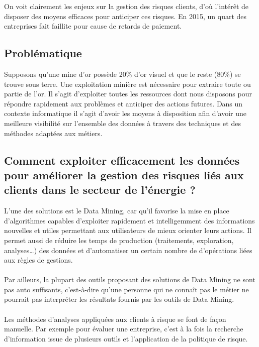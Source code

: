 \documentclass[11pt,a4paper]{report}
\begin{document}
On voit clairement les enjeux sur la gestion des risques clients, d'où l'intérêt de disposer des moyens efficaces pour anticiper ces risques. En 2015, un quart des entreprises fait faillite  pour cause de retards de paiement.

\newpage
\subsection{Problématique}
Supposons qu’une mine d’or possède 20\% d’or visuel et que le reste (80\%) se trouve sous terre. Une exploitation minière est nécessaire pour extraire toute ou partie de l’or. Il s'agit d'exploiter toutes les ressources dont nous disposons pour répondre rapidement aux problèmes et anticiper des actions futures. 
Dans un contexte informatique il s’agit d’avoir les moyens à disposition afin d’avoir une meilleure visibilité sur l’ensemble des données à travers des techniques et des méthodes adaptées aux métiers. 
\subsection*{Comment exploiter efficacement les données pour améliorer la gestion des risques liés aux clients dans le secteur de l’énergie ?}

L’une des solutions est le Data Mining, car qu’il favorise la mise en place d'algorithmes capables d'exploiter rapidement et intelligemment des informations nouvelles et utiles permettant aux utilisateurs de mieux orienter leurs actions. Il permet aussi de réduire les temps de production (traitements, exploration, analyses…) des données et d’automatiser un certain nombre de d'opérations liées aux règles de gestions.\\\\
Par ailleurs, la plupart des outils proposant des solutions de Data Mining ne sont pas auto suffisants, c’est-à-dire qu'une personne qui ne connaît pas le métier ne pourrait pas interpréter les résultats fournis par les outils de Data Mining.\\\\
 Les méthodes d'analyses appliquées aux clients à risque se font de façon manuelle. Par exemple pour évaluer une entreprise, c'est à la fois la recherche d'information issue de plusieurs outils et l'application de la politique de risque. \\
\end{document}
